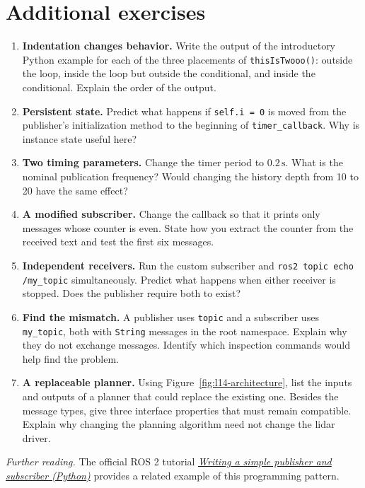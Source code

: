 \clearpage
\section{Additional exercises}
\begin{enumerate}
\item \textbf{Indentation changes behavior.} Write the output of the
introductory Python example for each of the three placements of
\texttt{thisIsTwooo()}: outside the loop, inside the loop but outside
the conditional, and inside the conditional. Explain the order of the output.
\item \textbf{Persistent state.} Predict what happens if \texttt{self.i = 0}
is moved from the publisher's initialization method to the beginning of
\texttt{timer\_callback}. Why is instance state useful here?
\item \textbf{Two timing parameters.} Change the timer period to
$0.2\,\mathrm{s}$. What is the nominal publication frequency? Would
changing the history depth from 10 to 20 have the same effect?
\item \textbf{A modified subscriber.} Change the callback so that it
prints only messages whose counter is even. State how you extract the
counter from the received text and test the first six messages.
\item \textbf{Independent receivers.} Run the custom subscriber and
\texttt{ros2 topic echo /my\_topic} simultaneously. Predict what happens
when either receiver is stopped. Does the publisher require both to exist?
\item \textbf{Find the mismatch.} A publisher uses \texttt{topic} and
a subscriber uses \texttt{my\_topic}, both with \texttt{String} messages
in the root namespace. Explain why they do not exchange messages. Identify
which inspection commands would help find the problem.
\item \textbf{A replaceable planner.} Using
Figure~\ref{fig:l14-architecture}, list the inputs and outputs of a planner
that could replace the existing one. Besides the message types, give three
interface properties that must remain compatible. Explain why changing
the planning algorithm need not change the lidar driver.
\end{enumerate}

\smallskip
\textit{Further reading.} The official ROS 2 tutorial
\href{https://docs.ros.org/en/humble/Tutorials/Beginner-Client-Libraries/Writing-A-Simple-Py-Publisher-And-Subscriber.html}{\emph{Writing a simple publisher and subscriber (Python)}}
provides a related example of this programming pattern.
